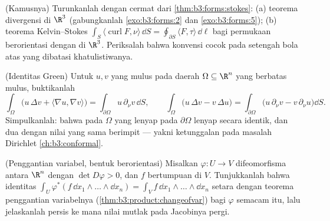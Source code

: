 \begin{exercise}[$\star\star$]\label{exo:b3:forms:7}
(Kamusnya) Turunkanlah dengan cermat dari
\cref{thm:b3:forms:stokes}: (a) teorema divergensi di
$\R^3$ (gabungkanlah \cref{exo:b3:forms:2} dan
\cref{exo:b3:forms:5}); (b) teorema Kelvin--Stokes
$\int_S\langle\operatorname{curl}F, \nu\rangle\,\dd S =
\oint_{\partial S}\langle F, \tau\rangle\,\dd\ell$ bagi
permukaan  berorientasi dengan  di $\R^3$. Periksalah bahwa
konvensi  cocok pada setengah bola atas yang
dibatasi khatulistiwanya.
\end{exercise}

\begin{exercise}[$\star\star$]\label{exo:b3:forms:8}
(Identitas Green) Untuk $u, v$ yang mulus pada 
daerah  $\Omega \subseteq \R^n$ yang berbatas
mulus, buktikanlah
\[
\int_\Omega\bigl(u\,\Delta v + \langle\nabla u, \nabla
v\rangle\bigr) = \int_{\partial\Omega}u\,\partial_\nu
v\,\dd S,
\qquad
\int_\Omega\bigl(u\,\Delta v - v\,\Delta u\bigr) =
\int_{\partial\Omega}\bigl(u\,\partial_\nu v -
v\,\partial_\nu u\bigr)\dd S .
\]
Simpulkanlah: bahwa  pada $\Omega$ yang lenyap pada
$\partial\Omega$ lenyap secara identik, dan dua  dengan nilai  yang sama berimpit ---
yakni ketunggalan pada masalah Dirichlet
\cref{ch:b3:conformal}.
\end{exercise}

\begin{exercise}[$\star\star$]\label{exo:b3:forms:9}
(Penggantian variabel, bentuk berorientasi) Misalkan $\varphi\colon U
\to V$ difeomorfisma antara  $\R^n$ dengan $\det
D\varphi > 0$, dan $f$  bertumpuan  di
$V$. Tunjukkanlah bahwa identitas 
$\int_U\varphi^*(f\,\dd x_1\wedge\dots\wedge\dd x_n) =
\int_Vf\,\dd x_1\wedge\dots\wedge\dd x_n$ setara dengan
teorema penggantian variabelnya
(\cref{thm:b3:product:changeofvar}) bagi $\varphi$ semacam itu, lalu
jelaskanlah persis ke mana nilai mutlak pada Jacobinya
pergi.
\end{exercise}

